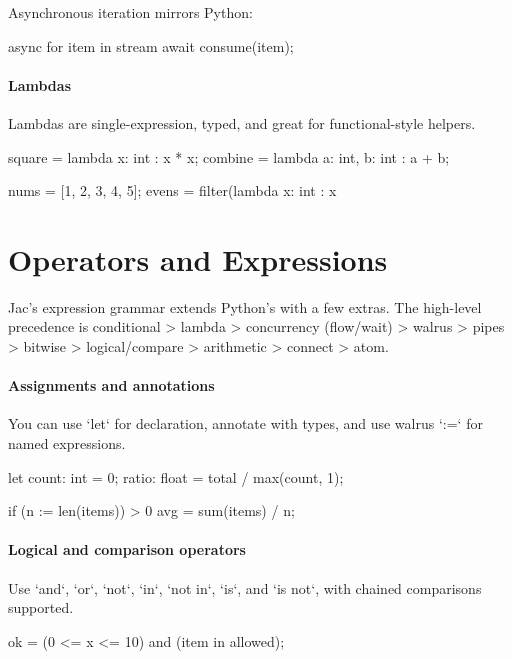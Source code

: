 Asynchronous iteration mirrors Python:

\begin{jacblock}
async for item in stream {
    await consume(item);
}
\end{jacblock}

\paragraph{Lambdas}

Lambdas are single-expression, typed, and great for functional-style helpers.

\begin{jacblock}
square = lambda x: int : x * x;
combine = lambda a: int, b: int : a + b;

nums = [1, 2, 3, 4, 5];
evens = filter(lambda x: int : x %
\end{jacblock}

\section{Operators and Expressions}

Jac's expression grammar extends Python's with a few extras. The high-level precedence is conditional > lambda > concurrency (flow/wait) > walrus > pipes > bitwise > logical/compare > arithmetic > connect > atom.

\paragraph{Assignments and annotations}

You can use `let` for declaration, annotate with types, and use walrus `:=` for named expressions.

\begin{jacblock}
let count: int = 0;
ratio: float = total / max(count, 1);

if (n := len(items)) > 0 {
    avg = sum(items) / n;
}
\end{jacblock}

\paragraph{Logical and comparison operators}

Use `and`, `or`, `not`, `in`, `not in`, `is`, and `is not`, with chained comparisons supported.

\begin{jacblock}
ok = (0 <= x <= 10) and (item in allowed);
\end{jacblock}

